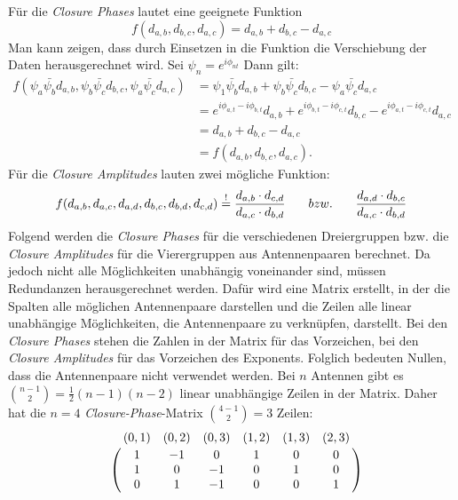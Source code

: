 Für die \emph{Closure Phases} lautet eine geeignete Funktion
\begin{equation}f(d_{a,b},d_{b,c},d_{a,c})=d_{a,b}+d_{b,c}-d_{a,c}\end{equation}
Man kann zeigen, dass durch Einsetzen in die Funktion die Verschiebung der Daten herausgerechnet wird. 
Sei $\psi_n = e^{i \phi_{nt}}$ Dann gilt:
\begin{align}
f(\psi_a\bar{\psi_b} d_{a,b},\psi_b\bar{\psi_c}d_{b,c},\psi_a \bar{\psi_c} d_{a,c})&=\psi_1\bar{\psi_b}d_{a,b}+\psi_b\bar{\psi_c}d_{b,c}-\psi_a \bar{\psi_c} d_{a,c}\\
&=e^{i \phi_{a,t}-i\phi_{b,t}}d_{a,b}+e^{i \phi_{b,t}-i\phi_{c,t}}d_{b,c}-e^{i \phi_{a,t}-i\phi_{c,t}}d_{a,c}\\
&=d_{a,b}+d_{b,c}-d_{a,c}\\
&=f(d_{a,b},d_{b,c},d_{a,c}).
\end{align}
Für die \emph{Closure Amplitudes} lauten zwei mögliche Funktion:
\begin{align}
f(d_{a, b},d_{a, c},d_{a, d},d_{b, c},d_{b, d},d_{c, d})\overset{!}{=}\frac{d_{a,b}\cdot d_{c,d}}{d_{a,c} \cdot d_{b,d}}
\hspace{3mm}\text \quad {bzw.} \quad \hspace{3mm} \frac{d_{a,d}\cdot d_{b,c}}{d_{a,c} \cdot d_{b,d}}
\end{align}
Folgend werden die \emph{Closure Phases} für die verschiedenen Dreiergruppen bzw. die \emph{Closure Amplitudes} für die Vierergruppen aus Antennenpaaren berechnet. Da jedoch nicht alle Möglichkeiten unabhängig voneinander sind, müssen Redundanzen herausgerechnet werden.
Dafür wird eine Matrix erstellt, in der die Spalten alle möglichen Antennenpaare darstellen und die Zeilen alle linear unabhängige Möglichkeiten, die Antennenpaare zu verknüpfen, darstellt. Bei den  \emph{Closure Phases} stehen die Zahlen in der Matrix für das Vorzeichen, bei den \emph{Closure Amplitudes} für das Vorzeichen des Exponents. Folglich bedeuten Nullen, dass die Antennenpaare nicht verwendet werden.  Bei $n$ Antennen gibt es $\binom{n-1}{2}= \frac{1}{2}(n-1)(n-2)$ linear unabhängige Zeilen in der Matrix. 
Daher hat die $n=4$ \emph{Closure-Phase}-Matrix $\binom{4-1}{2}=3$ Zeilen:
\begin{equation}
\bordermatrix{
~ &(0,1)&(0,2)&(0,3)&(1,2)&(1,3)&(2,3)\cr
~&1&-1&0&1&0&0 \cr
~&1&0&-1&0&1&0 \cr
~&0&1&-1&0&0&1 \cr}
\end{equation}

